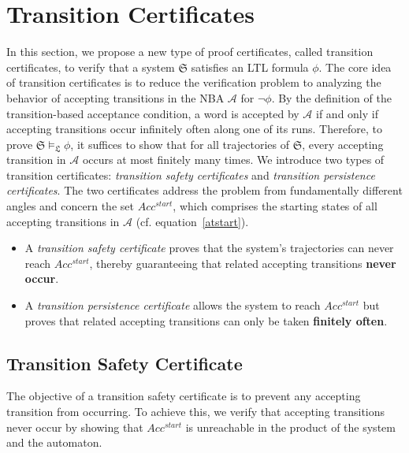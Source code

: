 \section{Transition Certificates}
\label{sec:method}
In this section, we propose a new type of proof certificates, called transition certificates, to verify that a system $\mathfrak{S}$ satisfies an LTL formula $\phi$. The core idea of transition certificates is to reduce the verification problem to analyzing the behavior of accepting transitions in the NBA $\mathcal{A}$ for $\neg\phi$. By the definition of the transition-based acceptance condition, a word is accepted by $\mathcal{A}$ if and only if accepting transitions occur infinitely often along one of its runs. Therefore, to prove $\mathfrak{S} \models_{\mathfrak{L}} \phi$, it suffices to show that for all trajectories of $\mathfrak{S}$, every accepting transition in $\mathcal{A}$ occurs at most finitely many times. We introduce two types of transition certificates: \emph{transition safety certificates} and \emph{transition persistence certificates}. The two certificates address the problem from fundamentally different angles and concern the set $Acc^{start}$, which comprises the starting states of all accepting transitions in $\mathcal{A}$ (cf. equation~\ref{atstart}).

\begin{itemize}
    \item A \emph{transition safety certificate} proves that the system's trajectories can never reach $Acc^{start}$, thereby guaranteeing that related accepting transitions \textbf{never occur}.
    \item A \emph{transition persistence certificate} allows the system to reach $Acc^{start}$ but proves that related accepting transitions can only be taken \textbf{finitely often}.
\end{itemize}


\subsection{Transition Safety Certificate}

The objective of a transition safety certificate is to prevent any accepting transition from occurring. To achieve this, we verify that accepting transitions never occur by showing that $Acc^{start}$ is unreachable in the product of the system and the automaton.

